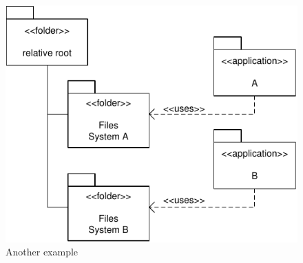 \begin{figure}[h]
\centering
\includegraphics{patterns/singleFileLocationDiagram-02.pdf}
\caption{Another example}
\label{fig:singleFileLocationDiagram-02}
\end{figure}
